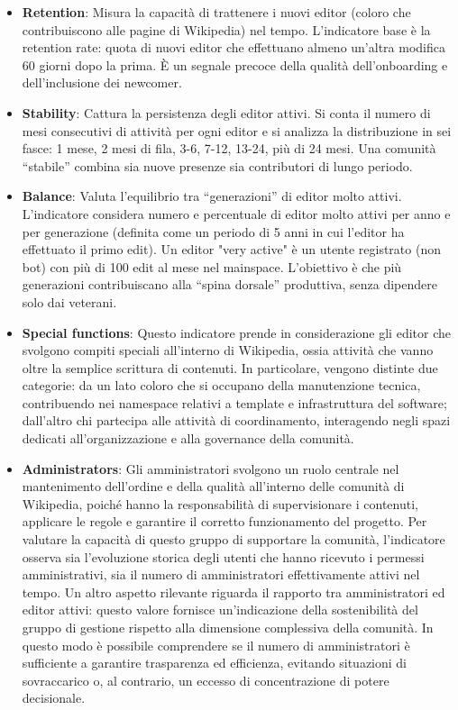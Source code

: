 \begin{itemize}
    \item \textbf{Retention}: Misura la capacità di trattenere i nuovi editor (coloro che contribuiscono alle pagine di Wikipedia) nel tempo. L’indicatore base è la retention rate: quota di nuovi editor che effettuano almeno un’altra modifica 60 giorni dopo la prima. È un segnale precoce della qualità dell’onboarding e dell’inclusione dei newcomer.
    \item \textbf{Stability}: Cattura la persistenza degli editor attivi. Si conta il numero di mesi consecutivi di attività per ogni editor e si analizza la distribuzione in sei fasce: 1 mese, 2 mesi di fila, 3-6, 7-12, 13-24, più di 24 mesi. Una comunità “stabile” combina sia nuove presenze sia contributori di lungo periodo.
    \item \textbf{Balance}: Valuta l’equilibrio tra “generazioni” di editor molto attivi. L’indicatore considera numero e percentuale di editor molto attivi per anno e per generazione (definita come un periodo di 5 anni  in cui l’editor ha effettuato il primo edit). Un editor "very active" è un utente registrato (non bot) con più di 100 edit al mese nel mainspace. L’obiettivo è che più generazioni contribuiscano alla “spina dorsale” produttiva, senza dipendere solo dai veterani.
    \item \textbf{Special functions}: Questo indicatore prende in considerazione gli editor che svolgono compiti speciali all’interno di Wikipedia, ossia attività che vanno oltre la semplice scrittura di contenuti. In particolare, vengono distinte due categorie: da un lato coloro che si occupano della manutenzione tecnica, contribuendo nei namespace relativi a template e infrastruttura del software; dall’altro chi partecipa alle attività di coordinamento, interagendo negli spazi dedicati all’organizzazione e alla governance della comunità.
    \item \textbf{Administrators}: Gli amministratori svolgono un ruolo centrale nel mantenimento dell’ordine e della qualità all’interno delle comunità di Wikipedia, poiché hanno la responsabilità di supervisionare i contenuti, applicare le regole e garantire il corretto funzionamento del progetto. Per valutare la capacità di questo gruppo di supportare la comunità, l’indicatore osserva sia l’evoluzione storica degli utenti che hanno ricevuto i permessi amministrativi, sia il numero di amministratori effettivamente attivi nel tempo. Un altro aspetto rilevante riguarda il rapporto tra amministratori ed editor attivi: questo valore fornisce un’indicazione della sostenibilità del gruppo di gestione rispetto alla dimensione complessiva della comunità. In questo modo è possibile comprendere se il numero di amministratori è sufficiente a garantire trasparenza ed efficienza, evitando situazioni di sovraccarico o, al contrario, un eccesso di concentrazione di potere decisionale.

\end{itemize}
